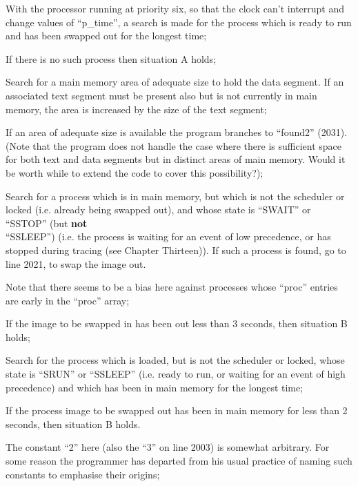 \bd
\item[1958:] With the processor running at
 priority six, so that the clock
 can't interrupt and change values
 of ``p\_time'', a search is made for
 the process which is ready to run
 and has been swapped out for the
 longest time;

\item[1966:] If there is no such process then
situation A holds;

\item[1976:] Search for a main memory area of
 adequate size to hold the data
 segment. If an associated text
 segment must be present also but
 is not currently in main memory,
 the area is increased by the size
 of the text segment;

\item[1982:] If an area of adequate size is
 available the program branches to
 ``found2'' (2031). (Note that the
 program does not handle the case
 where there is sufficient space
 for both text and data segments
 but in distinct areas of main
 memory. Would it be worth while
 to extend the code to cover this
 possibility?);

\item[1990:] Search for a process which is in
 main memory, but which is not the
 scheduler or locked (i.e. already
 being swapped out), and whose
 state is ``SWAIT'' or ``SSTOP'' (but
 {\bf not}\\
``SSLEEP'') (i.e. the process
 is waiting for an event of low
 precedence, or has stopped during
 tracing (see Chapter Thirteen)).
 If such a process is found, go to
 line 2021, to swap the image out.

Note that there seems to be a
bias here against processes whose
``proc'' entries are early in the
``proc'' array;

\item[2003:] If the image to be swapped in has
 been out less than 3 seconds,
 then situation B holds;

\item[2005:] Search for the process which is
 loaded, but is not the scheduler
 or locked, whose state is ``SRUN''
 or ``SSLEEP'' (i.e. ready to run,
 or waiting for an event of high
 precedence) and which has been in
 main memory for the longest time;

\item[2013:] If the process image to be
 swapped out has been in main
 memory for less than 2 seconds,
 then situation B holds.

The constant ``2'' here (also the
``3'' on line 2003) is somewhat
arbitrary. For some reason the
programmer has departed from his
usual practice of naming such
constants to emphasise their origins;

